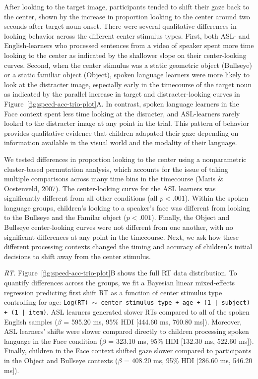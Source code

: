 \documentclass[english,floatsintext,man]{apa6}
\begin{document}
After looking to the target image, participants tended to shift their
gaze back to the center, shown by the increase in proportion looking to
the center around two seconds after target-noun onset. There were
several qualitative differences in looking behavior across the different
center stimulus types. First, both ASL- and English-learners who
processed sentences from a video of speaker spent more time looking to
the center as indicated by the shallower slope on their center-looking
curves. Second, when the center stimulus was a static geometric object
(Bullseye) or a static familiar object (Object), spoken language
learners were more likely to look at the distracter image, especially
early in the timecourse of the target noun as indicated by the parallel
increase in target and distracter-looking curves in
Figure~\ref{fig:speed-acc-trio-plot}A. In contrast, spoken language
learners in the Face context spent less time looking at the disracter,
and ASL-learners rarely looked to the distracter image at any point in
the trial. This pattern of behavior provides qualitative evidence that
children adapated their gaze depending on information available in the
visual world and the modality of their language.

We tested differences in proportion looking to the center using a
nonparametric cluster-based permutation analysis, which accounts for the
issue of taking multiple comparisons across many time bins in the
timecourse (Maris \& Oostenveld, 2007). The center-looking curve for the
ASL learners was significantly different from all other conditions (all
\(p < .001\)). Within the spoken language groups, children's looking to
a speaker's face was different from looking to the Bullseye and the
Familar object (\(p < .001\)). Finally, the Object and Bullseye
center-looking curves were not different from one another, with no
significant differences at any point in the timecourse. Next, we ask how
these different processing contexts changed the timing and accuracy of
children's initial decisions to shift away from the center stimulus.

\emph{RT.} Figure~\ref{fig:speed-acc-trio-plot}B shows the full RT data
distribution. To quantify differences across the groups, we fit a
Bayesian linear mixed-effects regression predicting first shift RT as a
function of center stimulus type controlling for age:
\texttt{Log(RT) $\sim$ center stimulus type + age +  (1 | subject) + (1 | item)}.
ASL learners generated slower RTs compared to all of the spoken English
samples (\(\beta\) = 595.20 ms, 95\% HDI {[}444.60 ms, 760.80 ms{]}).
Moreover, ASL learners' shifts were slower compared directly to children
processing spoken language in the Face condition (\(\beta\) = 323.10 ms,
95\% HDI {[}132.30 ms, 522.60 ms{]}). Finally, children in the Face
context shifted gaze slower compared to participants in the Object and
Bullseye contexts (\(\beta\) = 408.20 ms, 95\% HDI {[}286.60 ms, 546.20
ms{]}).
\end{document}
